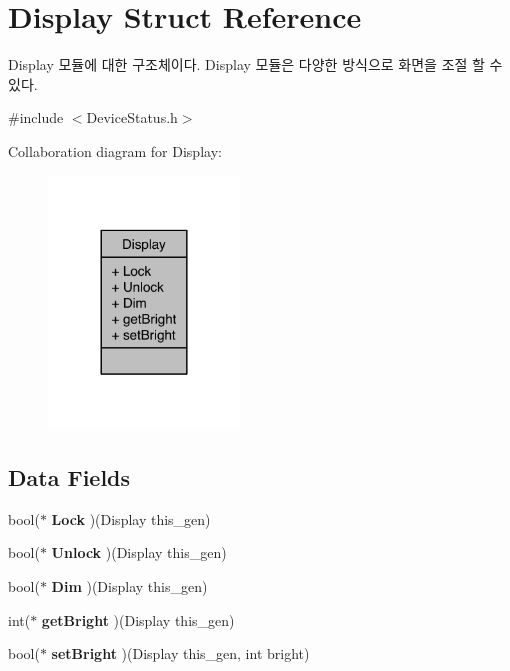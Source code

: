 \section{Display Struct Reference}
\label{struct__Display}


Display 모듈에 대한 구조체이다. Display 모듈은 다양한 방식으로 화면을 조절 할 수 있다.  




{\ttfamily \#include $<$Device\-Status.\-h$>$}



Collaboration diagram for Display\-:
\nopagebreak
\begin{figure}[H]
\begin{center}
\leavevmode
\includegraphics[width=144pt]{struct__Display__coll__graph}
\end{center}
\end{figure}
\subsection*{Data Fields}
\begin{DoxyCompactItemize}
\item 
bool($\ast$ {\bfseries Lock} )(Display this\-\_\-gen)\label{struct__Display_ae63a3abcf51257dbc7f94817504953e9}

\item 
bool($\ast$ {\bfseries Unlock} )(Display this\-\_\-gen)\label{struct__Display_a30c16960b10431b893543a04a25d282f}

\item 
bool($\ast$ {\bfseries Dim} )(Display this\-\_\-gen)\label{struct__Display_a244281b52b37bea0fc4ecc449e94892b}

\item 
int($\ast$ {\bfseries get\-Bright} )(Display this\-\_\-gen)\label{struct__Display_a4496ff482b37623f947cb8104f0d1bc3}

\item 
bool($\ast$ {\bfseries set\-Bright} )(Display this\-\_\-gen, int bright)\label{struct__Display_a8fa8f7fa9933f014e0ca2ededdc3a648}

\end{DoxyCompactItemize}


